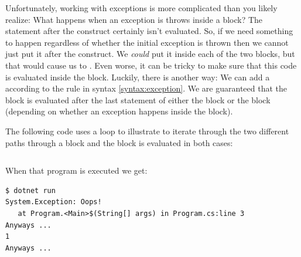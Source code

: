 Unfortunately, working with exceptions is more complicated than you likely realize: What happens when an exception is throws inside a  block? The statement after the  construct certainly isn't evaluated. So, if we need something to happen regardless of whether the initial exception is thrown then we cannot just put it after the  construct. We \textsl{could} put it inside each of the two blocks, but that would cause us to . Even worse, it can be tricky to make sure that this code is evaluated inside the  block. Luckily, there is another way: We can add a  according to the  rule in syntax \ref{syntax:exception}. We are guaranteed that the  block is evaluated after the last statement of either the  block or the  block (depending on whether an exception happens inside the  block).

The following code uses a loop to illustrate to iterate through the two different paths through a  block and the  block is evaluated in both cases:

\inputminted[firstline=1]{csharp}{../src/csharp/exceptions/finalization/Program.cs}

When that program is executed we get:

\begin{verbatim}
$ dotnet run
System.Exception: Oops!
   at Program.<Main>$(String[] args) in Program.cs:line 3
Anyways ...
1
Anyways ...
\end{verbatim}

